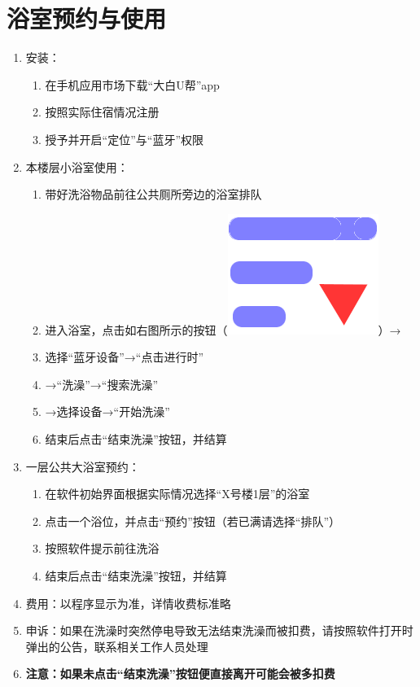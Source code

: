 \section[浴室预约与使用]{浴室预约与使用}
\label{wash_software}
\begin{enumerate}
    \item 安装：
          \begin{enumerate}
              \item 在手机应用市场下载“大白U帮”app
              \item 按照实际住宿情况注册
              \item 授予并开启“定位”与“蓝牙”权限
          \end{enumerate}
    \item 本楼层小浴室使用：
          \begin{enumerate}
              \item 带好洗浴物品前往公共厕所旁边的浴室排队
              \item 进入浴室，点击如右图所示的按钮（\mbox{\includegraphics[height=2.4ex]{bath.png}}）→
              \item 选择“蓝牙设备”→“点击进行时”
              \item →“洗澡”→“搜索洗澡”\footnotemark
              \item →选择设备\footnotemark →“开始洗澡”
              \item 结束后点击“结束洗澡”按钮，并结算
          \end{enumerate}
    \item 一层公共大浴室预约：
          \begin{enumerate}
              \item 在软件初始界面根据实际情况选择“X号楼1层”的浴室
              \item 点击一个浴位，并点击“预约”按钮（若已满请选择“排队”）
              \item 按照软件提示前往洗浴
              \item 结束后点击“结束洗澡”按钮，并结算
          \end{enumerate}
    \item 费用：以程序显示为准，详情收费标准略
    \item 申诉：如果在洗澡时突然停电导致无法结束洗澡而被扣费，请按照软件打开时弹出的公告，联系相关工作人员处理
    \item \textbf{注意：如果未点击“结束洗澡”按钮便直接离开可能会被多扣费}
\end{enumerate}

